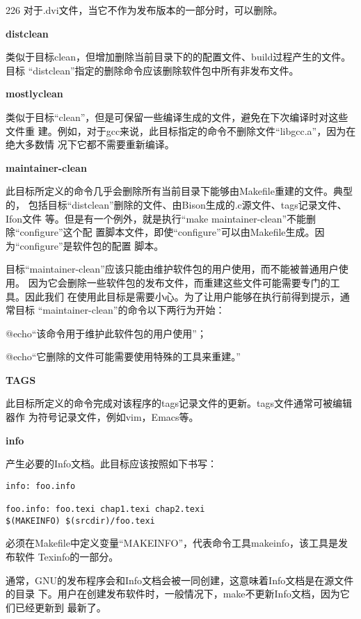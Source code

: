 \begin{dinglist}{226}
对于.dvi文件，当它不作为发布版本的一部分时，可以删除。

\item \textbf{distclean}

类似于目标clean，但增加删除当前目录下的的配置文件、build过程产生的文件。目标
“distclean”指定的删除命令应该删除软件包中所有非发布文件。

\item \textbf{mostlyclean}

类似于目标“clean”，但是可保留一些编译生成的文件，避免在下次编译时对这些文件重
建。例如，对于gcc来说，此目标指定的命令不删除文件“libgcc.a”，因为在绝大多数情
况下它都不需要重新编译。

\item \textbf{maintainer-clean}

此目标所定义的命令几乎会删除所有当前目录下能够由Makefile重建的文件。典型的，
包括目标“distclean”删除的文件、由Bison生成的.c源文件、tags记录文件、Ifon文件
等。但是有一个例外，就是执行“make maintainer-clean”不能删除“configure”这个配
置脚本文件，即使“configure”可以由Makefile生成。因为“configure”是软件包的配置
脚本。

目标“maintainer-clean”应该只能由维护软件包的用户使用，而不能被普通用户使用。
因为它会删除一些软件包的发布文件，而重建这些文件可能需要专门的工具。因此我们
在使用此目标是需要小心。为了让用户能够在执行前得到提示，通常目标
“maintainer-clean”的命令以下两行为开始：

@echo“该命令用于维护此软件包的用户使用”；

@echo“它删除的文件可能需要使用特殊的工具来重建。”

\item \textbf{TAGS}

此目标所定义的命令完成对该程序的tags记录文件的更新。tags文件通常可被编辑器作
为符号记录文件，例如vim，Emacs等。

\item \textbf{info}

产生必要的Info文档。此目标应该按照如下书写：

\begin{Verbatim}[]
info: foo.info

foo.info: foo.texi chap1.texi chap2.texi
$(MAKEINFO) $(srcdir)/foo.texi
\end{Verbatim}


必须在Makefile中定义变量“MAKEINFO”，代表命令工具makeinfo，该工具是发布软件
Texinfo的一部分。

通常，GNU的发布程序会和Info文档会被一同创建，这意味着Info文档是在源文件的目录
下。用户在创建发布软件时，一般情况下，make不更新Info文档，因为它们已经更新到
最新了。


\end{dinglist}

